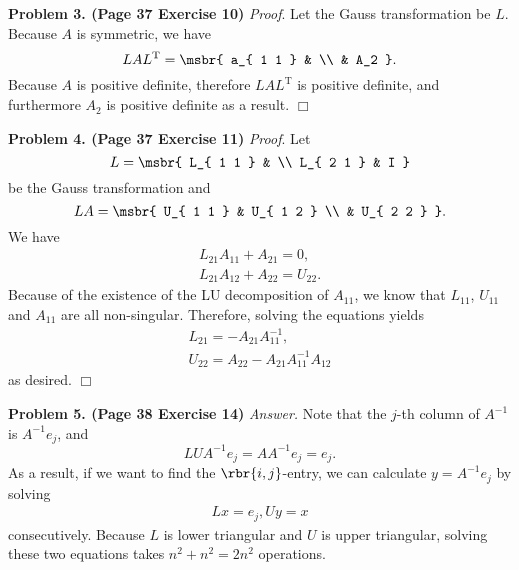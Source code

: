 \documentclass[english, nochinese]{pnote}
\begin{document}
\textbf{Problem 3. (Page 37 Exercise 10)} \textit{Proof}. Let the Gauss transformation be $L$. Because $A$ is symmetric, we have
\begin{equation}
L A L^{\text{T}} = \msbr{ a_{ 1 1 } & \\ & A_2 }.
\end{equation}
Because $A$ is positive definite, therefore $ L A L^{\text{T}} $ is positive definite, and furthermore $A_2$ is positive definite as a result.
\hfill$\Box$

\textbf{Problem 4. (Page 37 Exercise 11)} \textit{Proof}. Let
\begin{equation}
L = \msbr{ L_{ 1 1 } & \\ L_{ 2 1 } & I }
\end{equation}
be the Gauss transformation and
\begin{equation}
L A = \msbr{ U_{ 1 1 } & U_{ 1 2 } \\ & U_{ 2 2 } }.
\end{equation}
We have
\begin{gather}
L_{ 2 1 } A_{ 1 1 } + A_{ 2 1 } = 0, \\
L_{ 2 1 } A_{ 1 2 } + A_{ 2 2 } = U_{ 2 2 }.
\end{gather}
Because of the existence of the LU decomposition of $ A_{ 1 1 } $, we know that $ L_{ 1 1 } $, $ U_{ 1 1 } $ and $ A_{ 1 1 } $ are all non-singular. Therefore, solving the equations yields
\begin{gather}
L_{ 2 1 } = -A_{ 2 1 } A_{ 1 1 }^{-1}, \\
U_{ 2 2 } = A_{ 2 2 } - A_{ 2 1 } A_{ 1 1 }^{-1} A_{ 1 2 }
\end{gather}
as desired.
\hfill$\Box$

\textbf{Problem 5. (Page 38 Exercise 14)} \textit{Answer.} Note that the $j$-th column of $A^{-1}$ is $ A^{-1} e_j $, and
\begin{equation}
L U A^{-1} e_j = A A^{-1} e_j = e_j.
\end{equation}
As a result, if we want to find the $ \rbr{ i, j } $-entry, we can calculate $ y = A^{-1} e_j $ by solving
\begin{gather}
L x = e_j,
U y = x
\end{gather}
consecutively. Because $L$ is lower triangular and $U$ is upper triangular, solving these two equations takes $ n^2 + n^2 = 2 n^2 $ operations.
\end{document}
